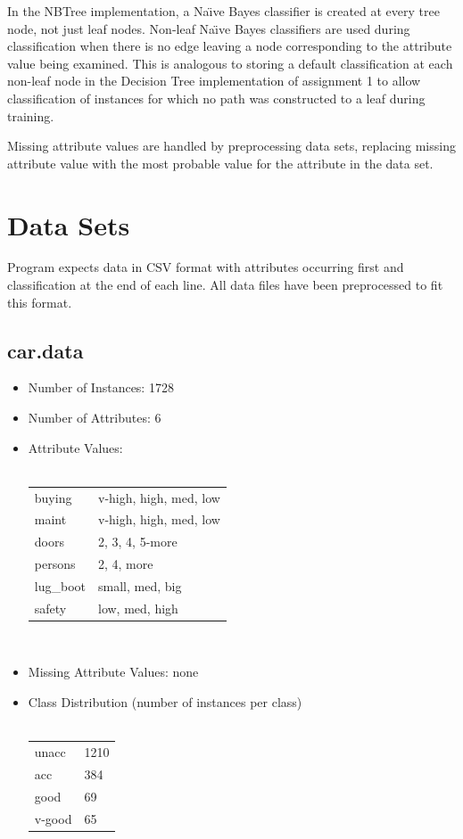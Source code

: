 \documentclass[10pt]{report}
\begin{document}
In the NBTree implementation, a Na\"{\i}ve Bayes classifier is created
at every tree node, not just leaf nodes. Non-leaf Na\"{\i}ve Bayes
classifiers are used during classification when there is no edge
leaving a node corresponding to the attribute value being
examined. This is analogous to storing a default classification at
each non-leaf node in the Decision Tree implementation of assignment 1
to allow classification of instances for which no path was constructed
to a leaf during training.

Missing attribute values are handled by preprocessing data sets,
replacing missing attribute value with the most probable value for the
attribute in the data set.


\section{Data Sets}
Program expects data in CSV format with attributes occurring first and
classification at the end of each line. All data files have been
preprocessed to fit this format.


\subsection*{car.data}
\begin{itemize}
\item Number of Instances: 1728
\item Number of Attributes: 6
\item Attribute Values:
  \\\\
  \begin{left}
    \begin{tabular}{ l l }
      buying     & v-high, high, med, low \\
      maint      & v-high, high, med, low \\
      doors      & 2, 3, 4, 5-more \\
      persons    & 2, 4, more \\
      lug\_boot  & small, med, big \\
      safety     & low, med, high \\
    \end{tabular}
  \end{left}
  \\
\item Missing Attribute Values: none
\item Class Distribution (number of instances per class)
  \\\\
  \begin{left}
    \begin{tabular}{ l l }
      unacc   &  1210 \\
      acc     &   384 \\   
      good    &    69 \\     
      v-good  &    65 \\
    \end{tabular}
  \end{left}
\end{itemize}
\end{document}
